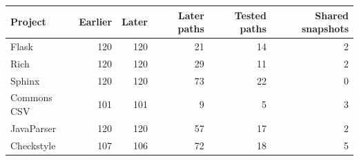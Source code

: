 \begin{tabular}{lrrrrr}
\toprule
Project & Earlier & Later & Later paths & Tested paths & Shared snapshots \\
\midrule
Flask & 120 & 120 & 21 & 14 & 2 \\
Rich & 120 & 120 & 29 & 11 & 2 \\
Sphinx & 120 & 120 & 73 & 22 & 0 \\
Commons CSV & 101 & 101 & 9 & 5 & 3 \\
JavaParser & 120 & 120 & 57 & 17 & 2 \\
Checkstyle & 107 & 106 & 72 & 18 & 5 \\
\bottomrule
\end{tabular}
